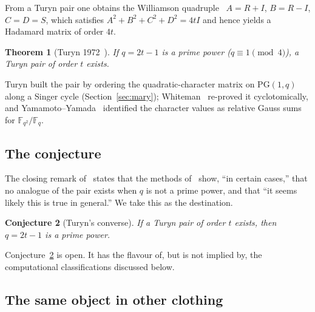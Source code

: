\documentclass[11pt]{article}
\theoremstyle{plain}
\newtheorem{theorem}{Theorem}[section]
\newtheorem{conjecture}[theorem]{Conjecture}
\theoremstyle{definition}
\theoremstyle{remark}
\newcommand{\F}{\mathbb F}
\newcommand{\PG}{\mathrm{PG}}
\begin{document}
From a Turyn pair one obtains the Williamson quadruple~\cite{Williamson44}
$A=R+I$, $B=R-I$, $C=D=S$, which satisfies $A^2+B^2+C^2+D^2=4tI$ and hence
yields a Hadamard matrix of order $4t$.

\begin{theorem}[Turyn 1972~\cite{Turyn72}]\label{thm:turyn}
If $q=2t-1$ is a prime power ($q\equiv1\pmod4$), a Turyn pair of order $t$
exists.
\end{theorem}

Turyn built the pair by ordering the quadratic-character matrix on
$\PG(1,q)$ along a Singer cycle (Section~\ref{sec:mary});
Whiteman~\cite{Whiteman73} re-proved it cyclotomically, and
Yamamoto--Yamada~\cite{YY85} identified the character values as relative Gauss
sums for $\F_{q^2}/\F_q$.

\subsection{The conjecture}

The closing remark of~\cite{Turyn72} states that the methods of~\cite{Turyn68}
show, ``in certain cases,'' that no analogue of the pair exists when $q$ is not
a prime power, and that ``it seems likely this is true in general.'' We take
this as the destination.

\begin{conjecture}[Turyn's converse]\label{conj:converse}
If a Turyn pair of order $t$ exists, then $q=2t-1$ is a prime power.
\end{conjecture}

Conjecture~\ref{conj:converse} is open. It has the flavour of, but is not
implied by, the computational classifications discussed below.

\subsection{The same object in other clothing}\label{sec:dictionary-intro}
\end{document}
